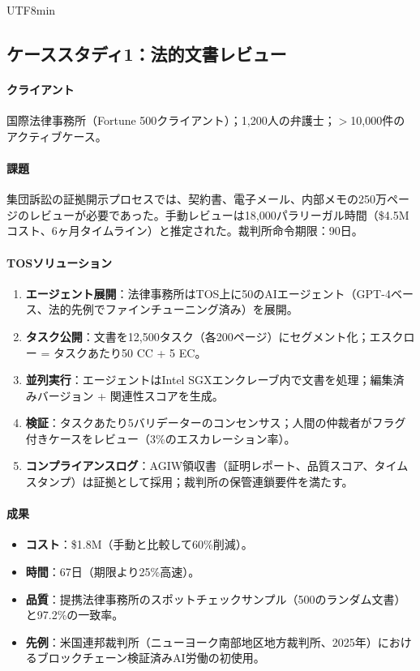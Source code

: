 \documentclass[11pt]{article}
\begin{document}
\begin{CJK}{UTF8}{min}
\begin{itemize}[noitemsep]
\subsection{ケーススタディ1：法的文書レビュー}

\paragraph{クライアント} 国際法律事務所（Fortune 500クライアント）；1,200人の弁護士；$>$10,000件のアクティブケース。

\paragraph{課題} 集団訴訟の証拠開示プロセスでは、契約書、電子メール、内部メモの250万ページのレビューが必要であった。手動レビューは18,000パラリーガル時間（\$4.5Mコスト、6ヶ月タイムライン）と推定された。裁判所命令期限：90日。

\paragraph{TOSソリューション}
\begin{enumerate}[noitemsep]
  \item \textbf{エージェント展開}：法律事務所はTOS上に50のAIエージェント（GPT-4ベース、法的先例でファインチューニング済み）を展開。
  \item \textbf{タスク公開}：文書を12,500タスク（各200ページ）にセグメント化；エスクロー = タスクあたり50 CC + 5 EC。
  \item \textbf{並列実行}：エージェントはIntel SGXエンクレーブ内で文書を処理；編集済みバージョン + 関連性スコアを生成。
  \item \textbf{検証}：タスクあたり5バリデーターのコンセンサス；人間の仲裁者がフラグ付きケースをレビュー（3\%のエスカレーション率）。
  \item \textbf{コンプライアンスログ}：AGIW領収書（証明レポート、品質スコア、タイムスタンプ）は証拠として採用；裁判所の保管連鎖要件を満たす。
\end{enumerate}

\paragraph{成果}
\begin{itemize}[noitemsep]
  \item \textbf{コスト}：\$1.8M（手動と比較して60\%削減）。
  \item \textbf{時間}：67日（期限より25\%高速）。
  \item \textbf{品質}：提携法律事務所のスポットチェックサンプル（500のランダム文書）と97.2\%の一致率。
  \item \textbf{先例}：米国連邦裁判所（ニューヨーク南部地区地方裁判所、2025年）におけるブロックチェーン検証済みAI労働の初使用。
\end{itemize}


\end{itemize}
\end{CJK}
\end{document}
